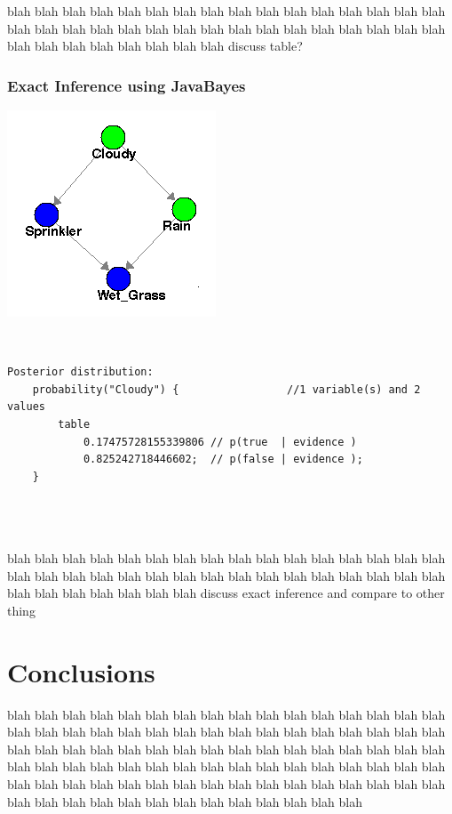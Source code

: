 \documentclass{article}
\begin{document}
blah blah blah blah blah blah blah blah blah blah blah blah blah blah blah blah blah blah blah blah blah blah blah blah blah blah blah blah blah blah blah blah blah blah blah blah blah blah blah blah discuss table?

\subsubsection{Exact Inference using JavaBayes}
\begin{minipage}{\linewidth}
\begin{center}
\includegraphics[scale=0.7]{part4_bn}
\end{center}
\end{minipage}\\

\begin{minipage}{\linewidth}
\begin{lstlisting}
Posterior distribution:
	probability("Cloudy") {                 //1 variable(s) and 2 values
		table 
			0.17475728155339806	// p(true  | evidence )
			0.825242718446602; 	// p(false | evidence );
	}
\end{lstlisting}
\end{minipage}\\
\\
\\

blah blah blah blah blah blah blah blah blah blah blah blah blah blah blah blah blah blah blah blah blah blah blah blah blah blah blah blah blah blah blah blah blah blah blah blah blah blah blah discuss exact inference and compare to other thing

\section{Conclusions}
blah blah blah blah blah blah blah blah blah blah blah blah blah blah blah blah blah blah blah blah blah blah blah blah blah blah blah blah blah blah blah blah blah blah blah blah blah blah blah blah blah blah blah blah blah blah blah blah blah blah blah blah blah blah blah blah blah blah blah blah blah blah blah blah blah blah blah blah blah blah blah blah blah blah blah blah blah blah blah blah blah blah blah blah blah blah blah blah blah blah blah blah blah 
\end{document}
